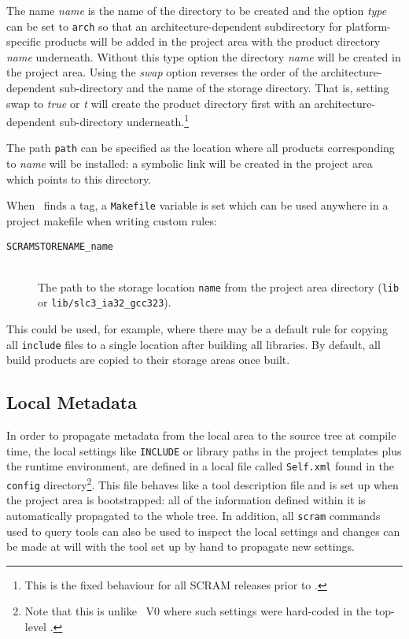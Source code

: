\ni The name \textit{name} is the name of the directory to be created
and the option \textit{type} can be set to \texttt{arch} so that an
architecture-dependent subdirectory for platform-specific products
will be added in the project area with the product directory
\textit{name} underneath. Without this type option the directory
\textit{name} will be created in the project area.  Using the
\textit{swap} option reverses the order of the architecture-dependent
sub-directory and the name of the storage directory. That is, setting
swap to \textit{true} or \textit{t} will create the product directory
first with an architecture-dependent sub-directory
underneath.\footnote{This is the fixed behaviour for all SCRAM
  releases prior to \scramvx.}

\ni The path \texttt{path} can be specified as the location where all
products corresponding to \textit{name} will be installed: a symbolic
link will be created in the project area which points to this
directory.

\ni When \scram\ finds a  tag, 
a \texttt{Makefile} variable is set which can be used anywhere in a project makefile
when writing custom rules:
\begin{description}
\item[\texttt{SCRAMSTORENAME\_name}]\mbox{}\\
  The path to the storage location \texttt{name} from the project area
  directory (\eg \texttt{lib} or \texttt{lib/slc3\_ia32\_gcc323}).
\end{description}

\ni This could be used, for example, where there may be a default rule for
copying all \texttt{include} files to a single location after building
all libraries. By default, all build products are copied to their
storage areas once built.

\subsection{Local Metadata}

In order to propagate metadata from the local area to the source tree
at compile time, the local settings like \texttt{INCLUDE} or library paths in the
project templates plus the runtime environment, are defined in a local
file called \texttt{Self.xml} found in the \texttt{config} directory\footnote{Note that this is unlike \scram\ V0 where
  such settings were hard-coded in the top-level \buildfile.}.
This file behaves like a tool description file and is set up when the project
area is bootstrapped: all of the information defined within it is
automatically propagated to the whole tree.
In addition, all \texttt{scram} commands used to query tools
can also be used to inspect the local settings and changes can be made
at will with the tool set up by hand to propagate new settings.


